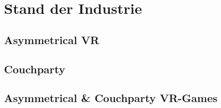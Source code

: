 \chapter{Stand der Industrie}


\section{Asymmetrical VR}

\section{Couchparty}

\section{Asymmetrical \& Couchparty VR-Games}


